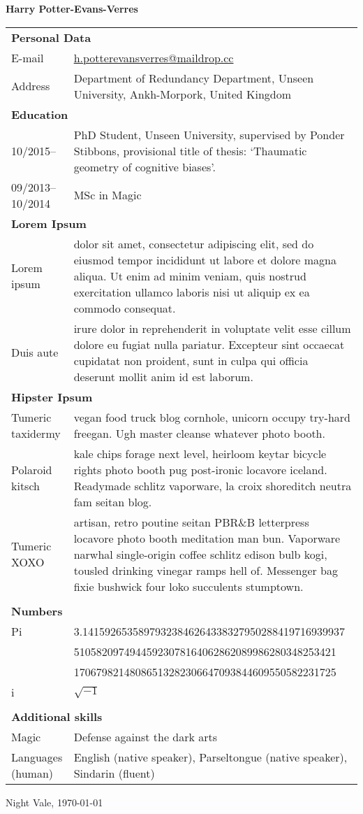 \documentclass[11pt, a4paper]{article}
\newcommand{\cvpart}[1]{\multicolumn{2}{l}{\textbf{\Large{#1}}} \vspace{.5em} \\}
\newcommand{\entryend}{\vspace{.5em}\\}
\newcommand{\cvpartend}{\vspace{1em}\\}
\begin{document}
\begin{center}
	\textbf{\huge{Harry Potter-Evans-Verres}}
\end{center}
\vspace{.5cm}

\begin{tabular}{l p{}}
\cvpart{Personal Data}
E-mail & \href{mailto:h.potterevansverres@maildrop.cc}{h.potterevansverres@maildrop.cc}\vspace{.5em} \\ 
Address & Department of Redundancy Department, Unseen University, Ankh-Morpork, United Kingdom  \vspace{1em} \\
\cvpart{Education}
10/2015-- & PhD Student, Unseen University, supervised by Ponder Stibbons, provisional title of thesis: `Thaumatic geometry of cognitive biases'.
\entryend

09/2013--10/2014 & MSc in Magic
\cvpartend

\cvpart{Lorem Ipsum}
Lorem ipsum &  dolor sit amet, consectetur adipiscing elit, sed do eiusmod tempor incididunt ut labore et dolore magna aliqua. Ut enim ad minim veniam, quis nostrud exercitation ullamco laboris nisi ut aliquip ex ea commodo consequat. \\
Duis aute & irure dolor in reprehenderit in voluptate velit esse cillum dolore eu fugiat nulla pariatur. Excepteur sint occaecat cupidatat non proident, sunt in culpa qui officia deserunt mollit anim id est laborum.
\cvpartend

\cvpart{Hipster Ipsum}
Tumeric taxidermy &  vegan food truck blog cornhole, unicorn occupy try-hard freegan. Ugh master cleanse whatever photo booth. \entryend
Polaroid kitsch & kale chips forage next level, heirloom keytar bicycle rights photo booth pug post-ironic locavore iceland. Readymade schlitz vaporware, la croix shoreditch neutra fam seitan blog. \\  Tumeric XOXO&  artisan, retro poutine seitan PBR\&B letterpress locavore photo booth meditation man bun. Vaporware narwhal single-origin coffee schlitz edison bulb kogi, tousled drinking vinegar ramps hell of. Messenger bag fixie bushwick four loko succulents stumptown.
\entryend
\cvpartend

\cvpart{Numbers}
Pi & 3.14159265358979323846264338327950288419716939937
\\ & 51058209749445923078164062862089986280348253421
\\ & 17067982148086513282306647093844609550582231725 
\entryend
i & $\sqrt{-1}$ 
\entryend
\cvpartend

\cvpart{Additional skills}
Magic & Defense against the dark arts \entryend
Languages (human) & English (native speaker), Parseltongue (native speaker), Sindarin (fluent)
\cvpartend
\end{tabular}

\vspace{.5cm}
Night Vale, \today
\end{document}
